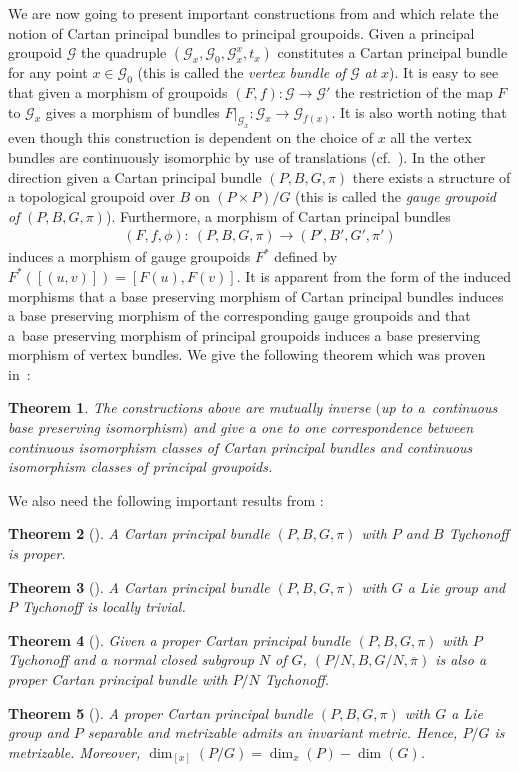 \documentclass[11pt]{article}
\newtheorem{tw}{Theorem}[section]
\begin{document}
We are now going to present important constructions from \cite{McK1} and \cite{McK2} which relate the notion of Cartan principal bundles to principal groupoids. Given a principal groupoid $\mathcal{G}$ the quadruple $(\mathcal{G}_x,\mathcal{G}_0,\mathcal{G}^x_x,t_x)$ constitutes a Cartan principal bundle for any point $x\in\mathcal{G}_0$ (this is called the \emph{vertex bundle of} $\mathcal{G}$ \emph{at} $x$). It is easy to see that given a morphism of groupoids $(F,f)\colon \mathcal{G}\rightarrow\mathcal{G}'$ the restriction of the map $F$ to $\mathcal{G}_x$ gives a morphism of bundles $F|_{\mathcal{G}_x}\colon \mathcal{G}_x\rightarrow\mathcal{G}_{f(x)}$. It is also worth noting that even though this construction is dependent on the choice of $x$ all the vertex bundles are continuously isomorphic by use of translations (cf.~\cite{McK1}). In the other direction given a Cartan principal bundle $(P,B,G,\pi)$ there exists a structure of a topological groupoid over $B$ on $(P\times P)\slash G$ (this is called the \emph{gauge groupoid of} $(P,B,G,\pi)$). Furthermore, a morphism of Cartan principal bundles
\begin{gather*}(F,f,\phi)\colon \ (P,B,G,\pi)\rightarrow (P',B',G',\pi')
\end{gather*} induces a morphism of gauge groupoids $F^*$ defined by $F^*([(u,v)])=[F(u),F(v)]$. It is apparent from the form of the induced morphisms that a base preserving morphism of Cartan principal bundles induces a base preserving morphism of the corresponding gauge groupoids and that a~base preserving morphism of principal groupoids induces a base preserving morphism of vertex bundles. We give the following theorem which was proven in~\cite{McK1}:
\begin{tw}\label{CPB} The constructions above are mutually inverse $($up to a~continuous base preserving isomorphism$)$ and give a one to one correspondence between continuous isomorphism classes of Cartan principal bundles and continuous isomorphism classes of principal groupoids.
\end{tw}
We also need the following important results from \cite{P}:
\begin{tw}[{\cite[Proposition 1.2.5]{P}}]\label{Slice2} A Cartan principal bundle $(P,B,G,\pi)$ with $P$ and $B$ Tychonoff is proper.
\end{tw}
\begin{tw}[{\cite[Section 4.1]{P}}]\label{Slice} A Cartan principal bundle $(P,B,G,\pi)$ with $G$ a Lie group and $P$ Tychonoff is locally trivial.
\end{tw}
\begin{tw}[{\cite[Proposition 1.3.2]{P}}] \label{Slice4} Given a proper Cartan principal bundle $(P,B,G,\pi)$ with $P$ Tychonoff and a normal closed subgroup $N$ of $G$, $(P\slash N,B,G\slash N,\overline{\pi})$ is also a proper Cartan principal bundle with $P\slash N$ Tychonoff.
\end{tw}
\begin{tw}[{\cite[Theorem 4.3.4]{P}}]\label{Slice3} A proper Cartan principal bundle $(P,B,G,\pi)$ with $G$ a Lie group and $P$ separable and metrizable admits an invariant metric. Hence, $P\slash G$ is metrizable. Moreover, $\dim_{[x]}(P\slash G)=\dim_x(P)-\dim(G)$.
\end{tw}
\end{document}
